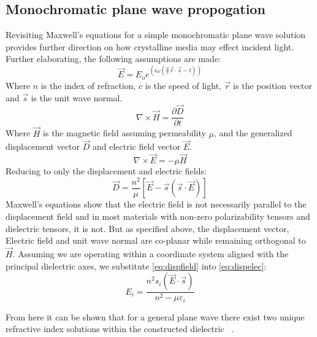 \subsection{Monochromatic plane wave propogation}
Revisiting Maxwell's equations for a simple monochromatic plane wave solution provides further direction on how crystalline media may effect incident light. Further elaborating, the following assumptions are made:
\begin{equation}
\vec{E} = E_o e^{(i \omega (\frac{n}{c} \vec{r}\cdot \vec{s}-t))}
\end{equation}
Where $n$ is the index of refraction, $c$ is the speed of light, $\vec{r}$ is the position vector and $\vec{s}$ is the unit wave normal.
\begin{equation}
\nabla \times \vec{H}= \frac{\partial \vec{D}}{\partial t}
\end{equation}
Where $\vec{H}$ is the magnetic field assuming permeability $\mu$, and the generalized displacement vector $\vec{D}$ and electric field vector $\vec{E}$.
\begin{equation}
\nabla \times \vec{E} = -\mu \vec{H}
\end{equation}
Reducing to only the displacement and electric fields:
\begin{equation}\label{eq:dispelec}
\vec{D} = \frac{n^2}{\mu}[\vec{E}-\vec{s}(\vec{s}\cdot \vec{E})]
\end{equation}
Maxwell's equations show that the electric field is not necessarily parallel to the displacement field and in most materials with non-zero polarizability tensors and dielectric tensors, it is not. But as specified above, the displacement vector, Electric field and unit wave normal are co-planar while remaining orthogonal to $\vec{H}$. Assuming we are operating within a coordinate system aligned with the principal dielectric axes, we substitute \autoref{eq:dispfield} into \autoref{eq:dispelec}:
\begin{equation}
E_i = \frac{n^2 s_i (\vec{E}\cdot\vec{s})}{n^2 - \mu \varepsilon_i}
\end{equation}

From here it can be shown that for a general plane wave there exist two unique refractive index solutions within the constructed dielectric ~\cite{nye}. 

